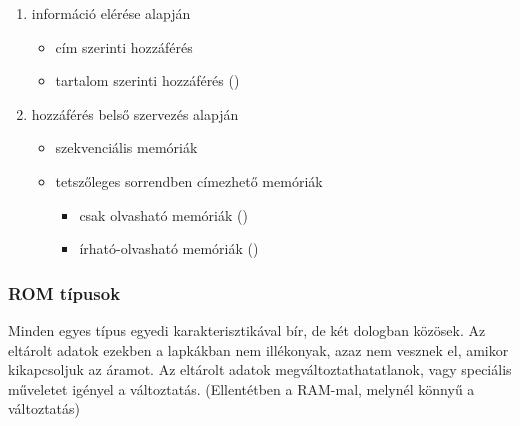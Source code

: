 \documentclass[../main.tex]{subfiles}
\begin{document}
\begin{enumerate}
	\item információ elérése alapján
	      \begin{itemize}
		      \item cím szerinti hozzáférés

		      \item tartalom szerinti hozzáférés ()
	      \end{itemize}

	\item hozzáférés belső szervezés alapján
	      \begin{itemize}
		      \item szekvenciális memóriák

		      \item tetszőleges sorrendben címezhető memóriák
		            \begin{itemize}
			            \item csak olvasható memóriák ()

			            \item írható-olvasható memóriák ()
		            \end{itemize}
	      \end{itemize}
\end{enumerate}

\subsubsection*{ROM típusok}

Minden egyes típus egyedi karakterisztikával bír, de két dologban közösek.
Az eltárolt adatok ezekben a lapkákban nem illékonyak, azaz nem vesznek el,
amikor kikapcsoljuk az áramot. Az eltárolt adatok megváltoztathatatlanok,
vagy speciális műveletet igényel a változtatás.
(Ellentétben a RAM-mal, melynél könnyű a változtatás)
\end{document}
